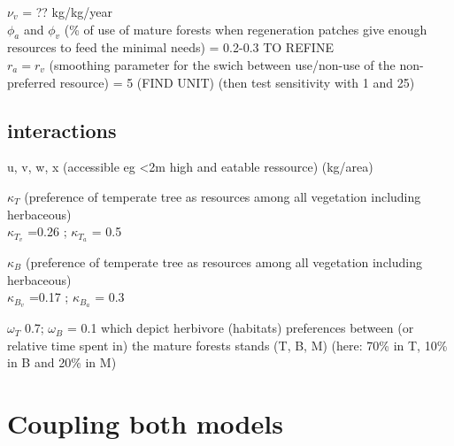 $\nu_v$ = ?? kg/kg/year \\


$\phi_a$ and $\phi_v$ (\% of use of mature forests when regeneration patches give enough resources to feed the minimal needs) = 0.2-0.3 TO REFINE \\

$r_a = r_v$ (smoothing parameter for the swich between use/non-use of the non-
preferred resource) = 5 (FIND UNIT) (then test sensitivity with 1 and 25)\\

\subsection*{interactions}

u, v, w, x (accessible eg <2m high and eatable ressource) (kg/area)

$\kappa_T$ (preference of temperate tree as resources among all vegetation including herbaceous)\\
$\kappa_{T_v}$ =0.26 ; $\kappa_{T_a}$ = 0.5

$\kappa_B$ (preference of temperate tree as resources among all vegetation including herbaceous) \\
$\kappa_{B_v}$ =0.17 ; $\kappa_{B_a}$ = 0.3

$\omega_T$ 0.7; $\omega_B$ = 0.1 which depict herbivore (habitats) preferences between (or relative time spent in) the mature forests stands (T, B, M) (here: 70\% in T, 10\% in B and 20\% in M)
















\newpage
\section{Coupling both models}

